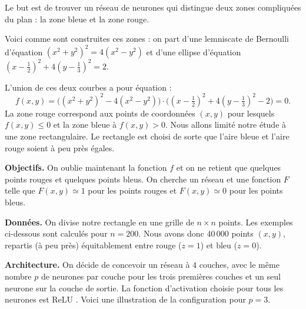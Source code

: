 \documentclass[11pt,class=report,crop=false]{standalone}
\begin{document}
Le but est de trouver un réseau de neurones qui distingue deux zones compliquées du plan : la zone bleue et la zone rouge.




Voici comme sont construites ces zones : on part d'une lemniscate de Bernoulli d'équation $(x^2+y^2)^2 = 4(x^2-y^2)$ et d'une ellipse d'équation
$(x-\frac12)^2 + 4(y-\frac13)^2=2$. 

\begin{center}
\begin{minipage}{0.31\textwidth}
\end{minipage}
\quad
\begin{minipage}{0.31\textwidth}

\end{minipage}
\quad
\begin{minipage}{0.31\textwidth}
\end{minipage}
\end{center}


L'union de ces deux courbes a pour équation :
$$f(x,y) = \big( (x^2+y^2)^2 - 4(x^2-y^2) \big)  \cdot \big((x-\tfrac12)^2 + 4(y-\tfrac13)^2 - 2 \big) = 0.$$
La zone rouge correspond aux points de coordonnées $(x,y)$ pour lesquels $f(x,y) \le 0$ et la zone bleue à $f(x,y) > 0$. Nous allons limité notre étude à une zone rectangulaire. Le rectangle est choisi de sorte que l'aire bleue et l'aire rouge soient à peu près égales.

\textbf{Objectifs.} 
On oublie maintenant la fonction $f$ et on ne retient que quelques points rouges et quelques points bleus. On cherche un réseau et une fonction $F$ telle que $F(x,y) \simeq 1$ pour les points rouges et $F(x,y) \simeq 0$ pour les points bleus.

\textbf{Données.} 
On divise notre rectangle en une grille de $n \times n$ points. Les exemples ci-dessous sont calculés pour $n=200$. Nous avons donc $40\,000$ points $(x,y)$, repartis (à peu près) équitablement entre rouge ($z=1$) et bleu ($z=0$).

\textbf{Architecture.}
On décide de concevoir un réseau à $4$ couches, avec le même nombre $p$ de neurones par couche pour les trois premières couches et un seul neurone sur la couche de sortie. La fonction d'activation choisie pour tous les neurones est ReLU .
Voici une illustration de la configuration pour $p=3$.
\end{document}
